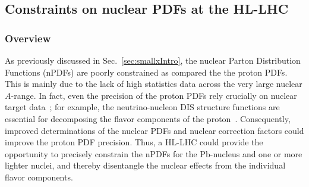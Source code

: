 \documentclass[../report.tex]{subfiles}
\begin{document}
\subsection{Constraints on nuclear PDFs at the HL-LHC}
\label{sec:nPDFs}
\subsubsection{Overview}
% 


As previously discussed in Sec.~\ref{sec:smallxIntro}, 
the nuclear Parton Distribution Functions (nPDFs) 
are poorly constrained as compared the the proton PDFs. 
This is mainly due to the lack of high statistics data 
across the very  large nuclear $A$-range. 
%
In fact, even the precision of the proton PDFs  rely crucially on 
nuclear target data~\cite{Ball:2017nwa,Dulat:2015mca,Alekhin:2017kpj};
for example,  the neutrino-nucleon DIS structure functions 
are essential for decomposing the flavor components of the 
proton~\cite{Onengut:2005kv,Goncharov:2001qe,Mason:2006qa,Samoylov:2013xoa,KayisTopaksu:2011mx}.
%
Consequently, improved determinations of the nuclear PDFs and nuclear correction factors 
could improve the proton PDF precision.
%
%
Thus, a \hbox{HL-LHC} could provide the opportunity to precisely constrain
the nPDFs for the Pb-nucleus and one or more lighter nuclei, and thereby
disentangle the nuclear effects from the individual flavor components.
\end{document}
